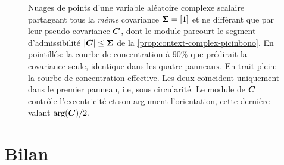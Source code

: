 \begin{figure}[h]
  \begin{center}
    
  \end{center}
  \provCircularityQR[.5cm]
  \caption{Nuages de points d'une variable aléatoire complexe scalaire partageant tous la \emph{même} covariance $\boldsymbol{\Sigma}=[1]$ et ne différant que par leur pseudo-covariance $\boldsymbol{C}$, dont le module parcourt le segment d'admissibilité $\left\lvert\boldsymbol{C}\right\rvert\leq\boldsymbol{\Sigma}$ de la \cref{prop:context-complex-picinbono}. En pointillés: la courbe de concentration à $90\%$ que prédirait la covariance seule, identique dans les quatre panneaux. En trait plein: la courbe de concentration effective. Les deux coïncident uniquement dans le premier panneau, i.e, sous circularité. Le module de $\boldsymbol{C}$ contrôle l'excentricité et son argument l'orientation, cette dernière valant $\arg(\boldsymbol{C})/2$. \provCircularity}
  \label{fig:context-complex-circularity}
\end{figure}


\section{Bilan}
\label{sec:context-definition-bilan}

%
%
%
%


